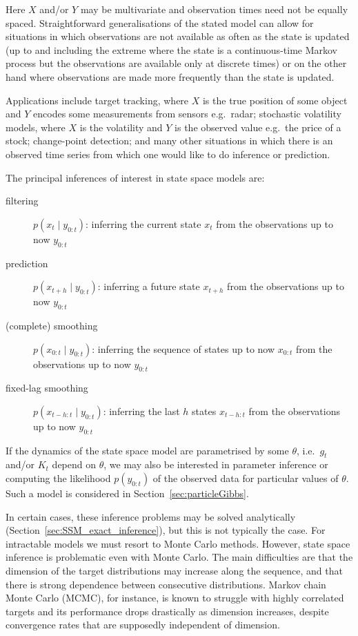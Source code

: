 Here $X$ and/or $Y$ may be multivariate and observation times need not be equally spaced. Straightforward generalisations of the stated model can allow for situations in which observations are not available as often as the state is updated (up to and including the extreme where the state is a continuous-time Markov process but the observations are available only at discrete times) or on the other hand where observations are made more frequently than the state is updated.

Applications include target tracking, where $X$ is the true position of some object and $Y$ encodes some measurements from sensors e.g.\ radar; stochastic volatility models, where $X$ is the volatility and $Y$ is the observed value e.g.\ the price of a stock; change-point detection; and many other situations in which there is an observed time series from which one would like to do inference or prediction.

The principal inferences of interest in state space models are:
\begin{description}
\item [filtering] $p(x_t\mid y_{0:t})$: inferring the current state $x_t$ from the observations up to now $y_{0:t}$
\item [prediction] $p(x_{t+h}\mid y_{0:t})$: inferring a future state $x_{t+h}$ from the observations up to now $y_{0:t}$
\item [(complete) smoothing] $p(x_{0:t}\mid y_{0:t})$: inferring the sequence of states up to now $x_{0:t}$ from the observations up to now $y_{0:t}$
\item [fixed-lag smoothing] $p(x_{t-h:t}\mid y_{0:t})$: inferring the last $h$ states $x_{t-h:t}$ from the observations up to now $y_{0:t}$
\end{description}
If the dynamics of the state space model are parametrised by some $\theta$, i.e.\ $g_t$ and/or $K_t$ depend on $\theta$, we may also be interested in parameter inference or computing the likelihood $p(y_{0:t})$ of the observed data for particular values of $\theta$. Such a model is considered in Section~\ref{sec:particleGibbs}.

In certain cases, these inference problems may be solved analytically (Section~\ref{sec:SSM_exact_inference}), but this is not typically the case. For intractable models we must resort to Monte Carlo methods. However, state space inference is problematic even with Monte Carlo. 
The main difficulties are that the dimension of the target distributions may increase along the sequence, and that there is strong dependence between consecutive distributions. Markov chain Monte Carlo (MCMC), for instance, is known to struggle with highly correlated targets\seb{[citation]} and its performance drops drastically as dimension increases, despite convergence rates that are supposedly independent of dimension\seb{[citation]}.

